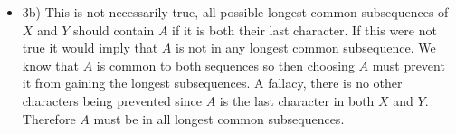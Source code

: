 \documentclass[ 12pt ]{article}
\begin{document}
\begin{itemize}
\begin{itemize}
		\item[] {\large 3b)}
		This is not necessarily true, all possible longest common subsequences of $X$ and $Y$ should contain $A$ if it is both
		their last character. If this were not true it would imply that $A$ is not in any longest common subsequence. We know
		that $A$ is common to both sequences so then choosing $A$ must prevent it from gaining the longest subsequences. A
		fallacy, there is no other characters being prevented since $A$ is the last character in both $X$ and $Y$. Therefore
		$A$ must be in all longest common subsequences.

	\end{itemize}
\end{itemize}
\end{document}
